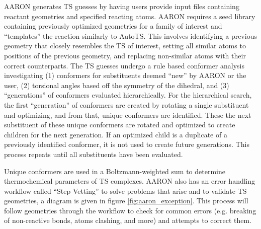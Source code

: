 \documentclass[preprint, 11pt]{elsarticle} %
\begin{document}
AARON generates TS guesses by having users provide input files containing reactant geometries and specified reacting atoms.
AARON requires a seed library containing previously optimized geometries for a family of interest and ``templates'' the reaction similarly to AutoTS.
This involves identifying a previous geometry that closely resembles the TS of interest, setting all similar atoms to positions of the previous geometry, and replacing non-similar atoms with their correct counterparts.
The TS guesses undergo a rule based conformer analysis investigating (1) conformers for substituents  deemed ``new'' by AARON or the user, (2) torsional angles based off the symmetry of the dihedral, and (3) ``generations'' of conformers evaluated hierarchically.
For the hierarchical search, the first ``generation'' of conformers are created by rotating a single substituent and optimizing, and from that, unique conformers are identified.
These the next substituent of these unique conformers are rotated and optimized to create children for the next generation. 
If an optimized child is a duplicate of a previously identified conformer, it is not used to create future generations.
This process repeats until all substituents have been evaluated. 

Unique conformers are used in a Boltzmann-weighted sum to determine thermochemical parameters of TS complexes. 
AARON also has an error handling workflow called ``Step Vetting'' to solve problems that arise and to validate TS geometries, a diagram is given in figure \ref{fig:aaron_exception}.
This process will follow geometries through the workflow to check for common errors (e.g. breaking of non-reactive bonds, atoms clashing, and more) and attempts to correct them.
\end{document}
